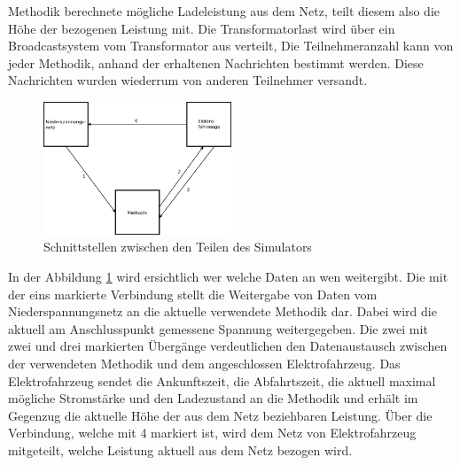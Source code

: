 Methodik berechnete mögliche Ladeleistung aus dem Netz, teilt diesem also die Höhe der bezogenen Leistung mit. Die Transformatorlast wird über ein Broadcastsystem vom Transformator aus verteilt, Die Teilnehmeranzahl kann von jeder Methodik, anhand der erhaltenen Nachrichten bestimmt werden. Diese Nachrichten wurden wiederrum von anderen Teilnehmer versandt.\\
\begin{figure}[htb]
\centering
	\includegraphics[width=0.5\textwidth]{img/SimAufbau1.png}
	\caption{Schnittstellen zwischen den Teilen des Simulators}
	\label{Abb_SimAufbau}
\end{figure}

In der Abbildung \ref{Abb_SimAufbau} wird ersichtlich wer welche Daten an wen weitergibt. Die mit der eins markierte Verbindung stellt die Weitergabe von Daten  vom Niederspannungsnetz an die aktuelle verwendete Methodik dar. Dabei wird die aktuell am Anschlusspunkt gemessene Spannung weitergegeben. Die zwei mit zwei und drei markierten Übergänge verdeutlichen den Datenaustausch zwischen der verwendeten Methodik und dem angeschlossen Elektrofahrzeug. Das Elektrofahrzeug sendet die Ankunftszeit, die Abfahrtszeit, die aktuell maximal mögliche Stromstärke und den Ladezustand an die Methodik und erhält im Gegenzug die aktuelle Höhe der aus dem Netz beziehbaren Leistung. Über die Verbindung, welche mit 4 markiert ist, wird dem Netz von Elektrofahrzeug mitgeteilt, welche Leistung aktuell aus dem Netz bezogen wird.
